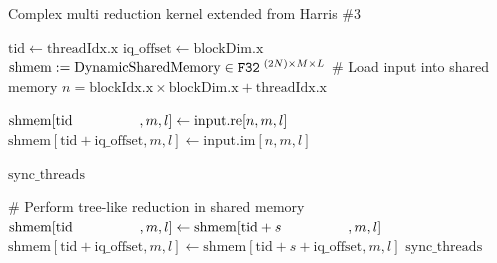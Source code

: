 \documentclass{juliacon}
\begin{document}
\begin{algorithm}[h]
    \caption{\label{alg:reduce-cplx} Complex multi reduction kernel extended from Harris \#3}
    
    \begin{algorithmic}[1]
            \vspace{1mm}
            \State $\mathrm{tid} \gets \mathrm{threadIdx.x}$
            \State $\mathrm{iq\_offset} \gets \mathrm{blockDim.x}$
            \State $\mathrm{shmem} := \mathrm{DynamicSharedMemory} \in \mathtt{F32}^{\hspace{1mm}(2N)\times M \times L}$
            \vspace{4mm}
            \State \# Load input into shared memory
            \State $n = \mathrm{blockIdx.x} \times \mathrm{blockDim.x} + \mathrm{threadIdx.x}$

                \vspace{1mm}
                    \State $\mathrm{shmem}[\mathrm{tid} \hspace{4.8em}, m, l] \gets \mathrm{input.re}[n, m, l]$
                    \State $\mathrm{shmem}[\mathrm{tid}+\mathrm{iq\_offset}, m, l] \gets \mathrm{input.im}[n, m, l]$
                \EndIf

                \vspace{2mm}
                \State $\mathrm{sync\_threads}$ 
                \vspace{2mm}

                \State \# Perform tree-like reduction in shared memory
                    \vspace{1mm}
                        \State $\mathrm{shmem}[\mathrm{tid} \hspace{4.8em}, m, l] \gets \mathrm{shmem}[\mathrm{tid} + s  \hspace{4.8em}, m, l]$
                        \State $\mathrm{shmem}[\mathrm{tid}+\mathrm{iq\_offset}, m, l] \gets \mathrm{shmem}[\mathrm{tid} + s +\mathrm{iq\_offset}, m, l] $
                        \vspace{2mm}
                        \State $\mathrm{sync\_threads}$ 
                    \EndIf
                \EndFor


\end{algorithmic}
\end{algorithm}
\end{document}
